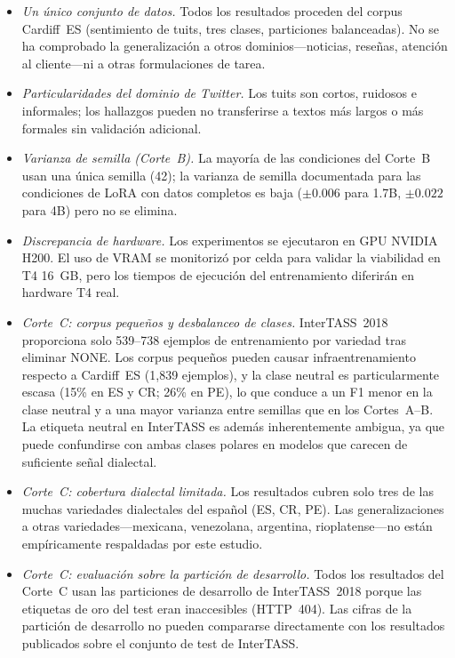 \documentclass[conference]{IEEEtran}
\begin{document}
\begin{itemize}
  \item \emph{Un único conjunto de datos.} Todos los resultados proceden del
    corpus Cardiff~ES (sentimiento de tuits, tres clases, particiones
    balanceadas).
    No se ha comprobado la generalización a otros dominios---noticias, reseñas,
    atención al cliente---ni a otras formulaciones de tarea.

  \item \emph{Particularidades del dominio de Twitter.} Los tuits son cortos,
    ruidosos e informales; los hallazgos pueden no transferirse a textos más
    largos o más formales sin validación adicional.

  \item \emph{Varianza de semilla (Corte~B).} La mayoría de las condiciones del
    Corte~B usan una única semilla (42); la varianza de semilla documentada para
    las condiciones de LoRA con datos completos es baja ($\pm0.006$ para 1.7B,
    $\pm0.022$ para 4B) pero no se elimina.

  \item \emph{Discrepancia de hardware.} Los experimentos se ejecutaron en GPU
    NVIDIA H200.
    El uso de VRAM se monitorizó por celda para validar la viabilidad en
    T4 16~GB, pero los tiempos de ejecución del entrenamiento diferirán en
    hardware T4 real.

  \item \emph{Corte~C: corpus pequeños y desbalanceo de clases.}
    InterTASS~2018 proporciona solo 539--738 ejemplos de entrenamiento por
    variedad tras eliminar NONE.
    Los corpus pequeños pueden causar infraentrenamiento respecto a Cardiff~ES
    (1,839 ejemplos), y la clase neutral es particularmente escasa (15\% en
    ES y CR; 26\% en PE), lo que conduce a un F1 menor en la clase neutral y a
    una mayor varianza entre semillas que en los Cortes~A--B.
    La etiqueta neutral en InterTASS es además inherentemente ambigua, ya que
    puede confundirse con ambas clases polares en modelos que carecen de
    suficiente señal dialectal.

  \item \emph{Corte~C: cobertura dialectal limitada.}
    Los resultados cubren solo tres de las muchas variedades dialectales del
    español (ES, CR, PE).
    Las generalizaciones a otras variedades---mexicana, venezolana, argentina,
    rioplatense---no están empíricamente respaldadas por este estudio.

  \item \emph{Corte~C: evaluación sobre la partición de desarrollo.}
    Todos los resultados del Corte~C usan las particiones de desarrollo de
    InterTASS~2018 porque las etiquetas de oro del test eran inaccesibles
    (HTTP~404).
    Las cifras de la partición de desarrollo no pueden compararse directamente
    con los resultados publicados sobre el conjunto de test de InterTASS.


\end{itemize}
\end{document}
